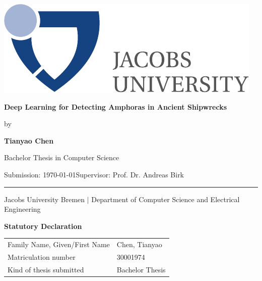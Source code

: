 \documentclass[a4paper, 11pt, oneside]{article}
\newcommand{\mylastname}{Chen}
\newcommand{\myfirstname}{Tianyao}
\newcommand{\mynumber}{30001974}
\newcommand{\myname}{\myfirstname{} \mylastname{}}
\newcommand{\mytitle}{Deep Learning for Detecting Amphoras in Ancient Shipwrecks}
\newcommand{\mysupervisor}{Prof. Dr. Andreas Birk}
\begin{document}

\thispagestyle{empty}

\begin{flushright}
  \includegraphics[scale=0.8]{bsc-logo}
\end{flushright}
\vspace*{40mm}
\begin{center}
  \huge
  \textbf{\mytitle}
\end{center}
\vspace*{4mm}
\begin{center}
 \Large by
\end{center}
\vspace*{4mm}
\begin{center}
  \LARGE
  \textbf{\myname}
\end{center}
\vspace*{20mm}
\begin{center}
  \Large
  Bachelor Thesis in Computer Science
\end{center}
\vfill
\begin{flushleft}
  \large
  Submission: \today \hfill Supervisor: \mysupervisor \\
  \rule{\textwidth}{1pt}
\end{flushleft}
\begin{center}
  Jacobs University Bremen $|$ Department of Computer Science and Electrical Engineering
\end{center}

\newpage
\thispagestyle{empty}

\begin{center}
  \Large \textbf{Statutory Declaration}
  \vspace*{8mm}
\end{center}

\begin{center}
  \begin{tabular}{|l|p{85mm}|}
    \hline
    Family Name, Given/First Name & \mylastname, \myfirstname \\
    Matriculation number & \mynumber \\
    Kind of thesis submitted & Bachelor Thesis \\
    \hline
  \end{tabular}
  \vspace*{8mm}
\end{center}
\end{document}
